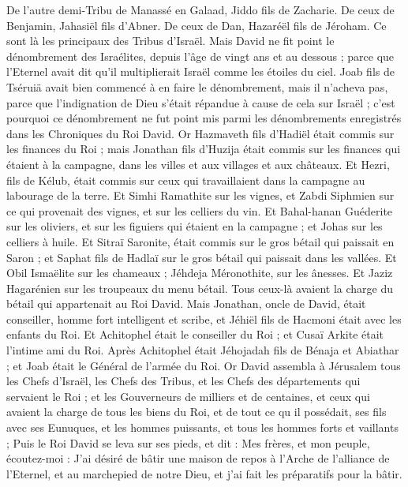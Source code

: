 \begin{multicols}{2}
De l'autre demi-Tribu de Manassé en Galaad, Jiddo fils de Zacharie. De ceux de Benjamin, Jahasiël fils d'Abner.
De ceux de Dan, Hazaréël fils de Jéroham. Ce sont là les principaux des Tribus d'Israël.
Mais David ne fit point le dénombrement des Israélites, depuis l'âge de vingt ans et au dessous ; parce que l'Eternel avait dit qu'il multiplierait Israël comme les étoiles du ciel.
Joab fils de Tséruiä avait bien commencé à en faire le dénombrement, mais il n'acheva pas, parce que l'indignation de Dieu s'était répandue à cause de cela sur Israël ; c'est pourquoi ce dénombrement ne fut point mis parmi les dénombrements enregistrés dans les Chroniques du Roi David.
Or Hazmaveth fils d'Hadiël était commis sur les finances du Roi ; mais Jonathan fils d'Huzija était commis sur les finances qui étaient à la campagne, dans les villes et aux villages et aux châteaux.
Et Hezri, fils de Kélub, était commis sur ceux qui travaillaient dans la campagne au labourage de la terre.
Et Simhi Ramathite sur les vignes, et Zabdi Siphmien sur ce qui provenait des vignes, et sur les celliers du vin.
Et Bahal-hanan Guéderite sur les oliviers, et sur les figuiers qui étaient en la campagne ; et Johas sur les celliers à huile.
Et Sitraï Saronite, était commis sur le gros bétail qui paissait en Saron ; et Saphat fils de Hadlaï sur le gros bétail qui paissait dans les vallées.
Et Obil Ismaëlite sur les chameaux ; Jéhdeja Méronothite, sur les ânesses.
Et Jaziz Hagarénien sur les troupeaux du menu bétail. Tous ceux-là avaient la charge du bétail qui appartenait au Roi David.
Mais Jonathan, oncle de David, était conseiller, homme fort intelligent et scribe, et Jéhiël fils de Hacmoni était avec les enfants du Roi.
Et Achitophel était le conseiller du Roi ; et Cusaï Arkite était l'intime ami du Roi.
Après Achitophel était Jéhojadah fils de Bénaja et Abiathar ; et Joab était le Général de l'armée du Roi.
\VerseOne{}Or David assembla à Jérusalem tous les Chefs d'Israël, les Chefs des Tribus, et les Chefs des départements qui servaient le Roi ; et les Gouverneurs de milliers et de centaines, et ceux qui avaient la charge de tous les biens du Roi, et de tout ce qu il possédait, ses fils avec ses Eunuques, et les hommes puissants, et tous les hommes forts et vaillants ;
Puis le Roi David se leva sur ses pieds, et dit : Mes frères, et mon peuple, écoutez-moi : J'ai désiré de bâtir une maison de repos à l'Arche de l'alliance de l'Eternel, et au marchepied de notre Dieu, et j'ai fait les préparatifs pour la bâtir.

\end{multicols}
